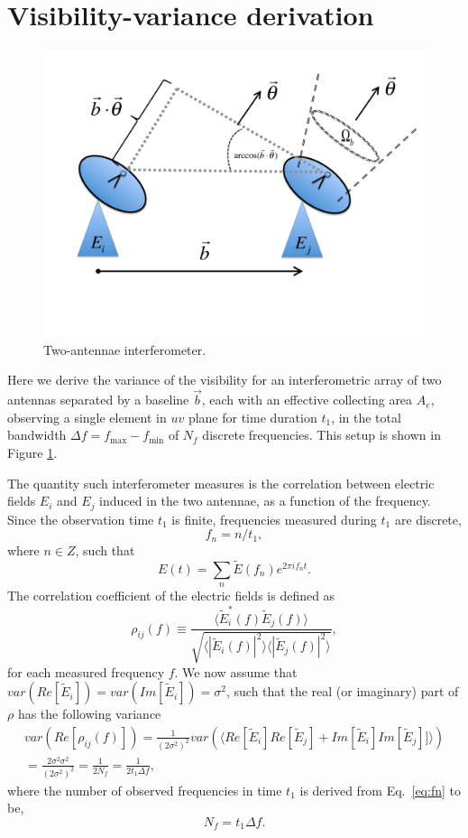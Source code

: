 \documentclass[12pt]{paper}
\newcommand{\beq}{\begin{equation}}
\newcommand{\eeq}{\end{equation}}
\newcommand{\bga}{\begin{gathered}}
\newcommand{\ega}{\end{gathered}}
\begin{document}
\section{Visibility-variance derivation}
\label{app_Vrms}

\begin{figure}
\centering
\includegraphics[width=.5\textwidth,keepaspectratio=true]{2antennae.pdf}
\caption{Two-antennae interferometer.\label{fig:2antennae}}
\end{figure}

Here we derive the variance of the visibility for an interferometric array of two antennas separated by a baseline $\vec{b}$, each with an effective collecting area $A_e$, observing a single element in $uv$ plane for time duration $t_1$, in the total bandwidth $\Delta f = f_\text{max}-f_\text{min}$ of $N_f$ discrete frequencies. This setup is shown in Figure \ref{fig:2antennae}.

The quantity such interferometer measures is the correlation between electric fields $E_i$ and $E_j$ induced in the two antennae, as a function of the frequency. Since the observation time $t_1$ is finite, frequencies measured during $t_1$ are discrete, 
\beq
f_n = n/t_1, 
\label{eq:fn}
\eeq
where $n\in Z$, such that
\beq
E(t) = \sum_{n}\widetilde{E}(f_n)e^{2\pi if_nt}.
\eeq
The correlation coefficient of the electric fields is defined as
\beq
\rho_{ij}(f) \equiv \frac{\langle \widetilde{E}^*_i(f)\widetilde E_j(f)\rangle}{\sqrt{\langle |\widetilde{E}_i(f)|^2\rangle\langle|\widetilde E_j(f)|^2\rangle}},
\label{eq:rho_ij}
\eeq
for each measured frequency $f$. We now assume that $var(Re[ \widetilde E_i])=var(Im[\widetilde E_i])=\sigma^2$, such that the real (or imaginary) part of $\rho$ has the following variance
\beq
\bga
var(Re[\rho_{ij}(f)]) = \frac{1}{(2\sigma^2)^2}var(\langle Re[\widetilde{E}_i]Re[\widetilde{E}_j] + Im[\widetilde{E}_i]Im[\widetilde{E}_j]]\rangle) \\
= \frac{2\sigma^2\sigma^2}{(2\sigma^2)^2} = \frac{1}{2N_f} = \frac{1}{2t_1\Delta f},
\ega
\label{eq:var_Rerho}
\eeq
where the number of observed frequencies in time $t_1$ is derived from Eq.~\ref{eq:fn} to be,
\beq
N_f =  t_1\Delta f.
\label{eq:Nf}
\eeq
\end{document}
